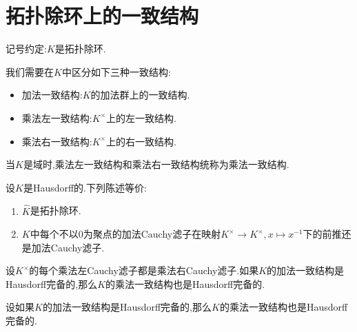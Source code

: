 \section{拓扑除环上的一致结构}

记号约定:$K$是拓扑除环.

\begin{convention}{}{}
	我们需要在$K$中区分如下三种一致结构:
	\begin{itemize}
		\item 加法一致结构:$K$的加法群上的一致结构.
		\item 乘法左一致结构:$K^{\times}$上的左一致结构.
		\item 乘法右一致结构:$K^{\times}$上的右一致结构.
	\end{itemize}
	当$K$是域时,乘法左一致结构和乘法右一致结构统称为乘法一致结构.
\end{convention}

\begin{proposition}{}{}
	设$K$是Hausdorff的.下列陈述等价:
	\begin{enumerate}
		\item $\hat{K}$是拓扑除环.
		\item $K$中每个不以$0$为聚点的加法Cauchy滤子在映射$K^{\times}\to K^{\times},x\mapsto x^{-1}$下的前推还是加法Cauchy滤子.
	\end{enumerate}
\end{proposition}

\begin{proposition}{}{}
	设$K^{\times}$的每个乘法左Cauchy滤子都是乘法右Cauchy滤子.如果$K$的加法一致结构是Hausdorff完备的,那么$K$的乘法一致结构也是Hausdorff完备的.
\end{proposition}

\begin{corollary}{}{}
	设如果$K$的加法一致结构是Hausdorff完备的,那么$K$的乘法一致结构也是Hausdorff完备的.
\end{corollary}
